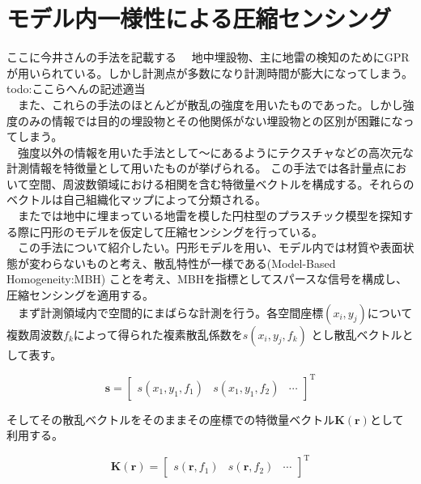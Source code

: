 \documentclass[12pt,a4paper]{jsreport}
\begin{document}
\section{モデル内一様性による圧縮センシング}
ここに今井さんの手法を記載する
　地中埋設物、主に地雷の検知のためにGPRが用いられている。しかし計測点が多数になり計測時間が膨大になってしまう。todo:ここらへんの記述適当
\\　また、これらの手法のほとんどが散乱の強度を用いたものであった。しかし強度のみの情報では目的の埋設物とその他関係がない埋設物との区別が困難になってしまう。
\\　強度以外の情報を用いた手法として\cite{hirose1}～\cite{hirose3}にあるようにテクスチャなどの高次元な計測情報を特徴量として用いたものが挙げられる。
この手法では各計量点において空間、周波数領域における相関を含む特徴量ベクトルを構成する。それらのベクトルは自己組織化マップによって分類される。
\\　また\cite{imai}では地中に埋まっている地雷を模した円柱型のプラスチック模型を探知する際に円形のモデルを仮定して圧縮センシングを行っている。
\\　この手法について紹介したい。円形モデルを用い、モデル内では材質や表面状態が変わらないものと考え、散乱特性が一様である(Model-Based Homogeneity:MBH)
ことを考え、MBHを指標としてスパースな信号を構成し、圧縮センシングを適用する。
\\　まず計測領域内で空間的にまばらな計測を行う。各空間座標$(x_i,y_j)$について複数周波数$f_k$によって得られた複素散乱係数を$s(x_i,y_j,f_k)$
とし散乱ベクトルとして表す。


\begin{equation}
  \bm{s} =
      \left[
      \begin{array}{rrrr}
      s(x_1,y_1,f_1)&s(x_1,y_1,f_2)&\cdots 
      \end{array}
      \right]^\mathrm{T}
      \label{scatteringVector}
  \end{equation}

  そしてその散乱ベクトルをそのままその座標での特徴量ベクトル$\bm{K(\bm{r})}$として利用する。

  \begin{equation}
    \bm{K(\bm{r})} =
        \left[
        \begin{array}{rrrr}
        s(\bm{r},f_1)&s(\bm{r},f_2)&\cdots 
        \end{array}
        \right]^\mathrm{T}
        \label{featureVector}
    \end{equation}
\end{document}
